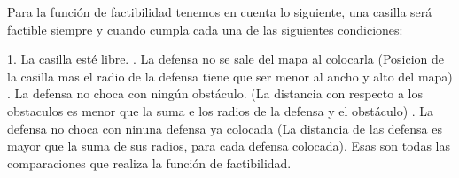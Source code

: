 Para la función de factibilidad tenemos en cuenta lo siguiente, una casilla será factible siempre y cuando cumpla cada una de las siguientes condiciones:

1. La casilla esté libre.
. La defensa no se sale del mapa al colocarla (Posicion de la casilla mas el radio de la defensa tiene que ser menor al ancho y alto del mapa)
. La defensa no choca con ningún obstáculo. (La distancia con respecto a los obstaculos es menor que la suma e los radios de la defensa y el obstáculo)
. La defensa no choca con ninuna defensa ya colocada (La distancia de las defensa es mayor que la suma de sus radios, para cada defensa colocada).
\newline
Esas son todas las comparaciones que realiza la función de factibilidad.